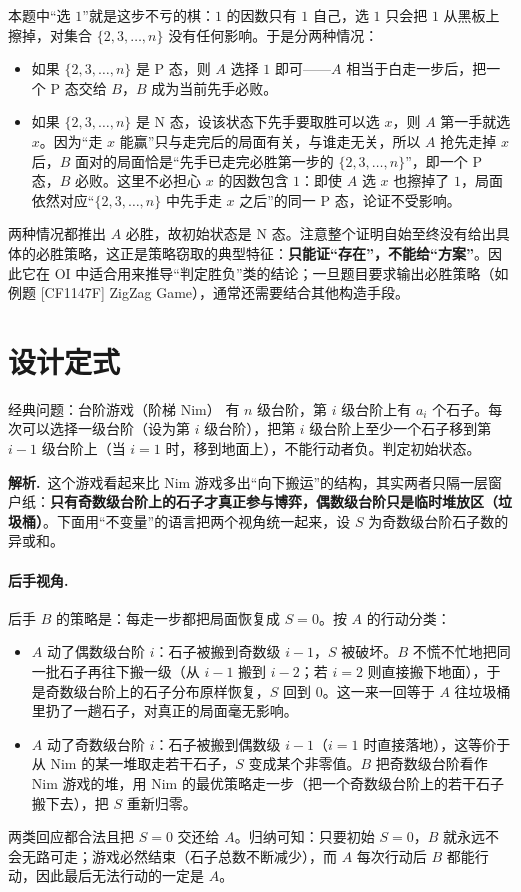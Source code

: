 \documentclass[UTF8,a4paper,11pt,oneside,openany,fontset=fandol]{ctexbook}
\theoremstyle{definition}
\newcommand{\sol}{\par\noindent\textbf{解析.}\ }
\begin{document}
本题中“选 $1$”就是这步不亏的棋：$1$ 的因数只有 $1$ 自己，选 $1$ 只会把 $1$ 从黑板上擦掉，对集合 $\{2,3,\ldots,n\}$ 没有任何影响。于是分两种情况：
\begin{itemize}
\item 如果 $\{2,3,\ldots,n\}$ 是 P 态，则 $A$ 选择 $1$ 即可——$A$ 相当于白走一步后，把一个 P 态交给 $B$，$B$ 成为当前先手必败。
\item 如果 $\{2,3,\ldots,n\}$ 是 N 态，设该状态下先手要取胜可以选 $x$，则 $A$ 第一手就选 $x$。因为“走 $x$ 能赢”只与走完后的局面有关，与谁走无关，所以 $A$ 抢先走掉 $x$ 后，$B$ 面对的局面恰是“先手已走完必胜第一步的 $\{2,3,\ldots,n\}$”，即一个 P 态，$B$ 必败。这里不必担心 $x$ 的因数包含 $1$：即使 $A$ 选 $x$ 也擦掉了 $1$，局面依然对应“$\{2,3,\ldots,n\}$ 中先手走 $x$ 之后”的同一 P 态，论证不受影响。
\end{itemize}
两种情况都推出 $A$ 必胜，故初始状态是 N 态。注意整个证明自始至终没有给出具体的必胜策略，这正是策略窃取的典型特征：\textbf{只能证“存在”，不能给“方案”}。因此它在 OI 中适合用来推导“判定胜负”类的结论；一旦题目要求输出必胜策略（如例题 [CF1147F] ZigZag Game），通常还需要结合其他构造手段。

\section{设计定式}
\begin{problem}{经典问题：台阶游戏（阶梯 Nim）}
有 $n$ 级台阶，第 $i$ 级台阶上有 $a_i$ 个石子。每次可以选择一级台阶（设为第 $i$ 级台阶），把第 $i$ 级台阶上至少一个石子移到第 $i-1$ 级台阶上（当 $i=1$ 时，移到地面上），不能行动者负。判定初始状态。
\end{problem}

\sol 这个游戏看起来比 Nim 游戏多出“向下搬运”的结构，其实两者只隔一层窗户纸：\textbf{只有奇数级台阶上的石子才真正参与博弈，偶数级台阶只是临时堆放区（垃圾桶）}。下面用“不变量”的语言把两个视角统一起来，设 $S$ 为奇数级台阶石子数的异或和。

\paragraph{后手视角.} 后手 $B$ 的策略是：每走一步都把局面恢复成 $S=0$。按 $A$ 的行动分类：
\begin{itemize}
\item $A$ 动了偶数级台阶 $i$：石子被搬到奇数级 $i-1$，$S$ 被破坏。$B$ 不慌不忙地把同一批石子再往下搬一级（从 $i-1$ 搬到 $i-2$；若 $i=2$ 则直接搬下地面），于是奇数级台阶上的石子分布原样恢复，$S$ 回到 $0$。这一来一回等于 $A$ 往垃圾桶里扔了一趟石子，对真正的局面毫无影响。
\item $A$ 动了奇数级台阶 $i$：石子被搬到偶数级 $i-1$（$i=1$ 时直接落地），这等价于从 Nim 的某一堆取走若干石子，$S$ 变成某个非零值。$B$ 把奇数级台阶看作 Nim 游戏的堆，用 Nim 的最优策略走一步（把一个奇数级台阶上的若干石子搬下去），把 $S$ 重新归零。
\end{itemize}
两类回应都合法且把 $S=0$ 交还给 $A$。归纳可知：只要初始 $S=0$，$B$ 就永远不会无路可走；游戏必然结束（石子总数不断减少），而 $A$ 每次行动后 $B$ 都能行动，因此最后无法行动的一定是 $A$。
\end{document}
